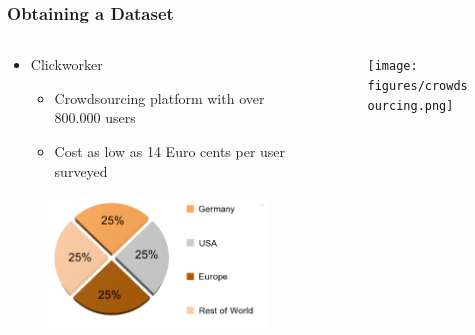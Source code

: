 \begin{frame}
	\frametitle{Obtaining a Dataset}
	\begin{columns}
		\begin{column}{0.5\textwidth}
			\begin{itemize}
				\item Clickworker
				\begin{itemize}
					\item Crowdsourcing platform with over 800.000 users
					\item Cost as low as 14 Euro cents per user surveyed
				\end{itemize}
			\end{itemize}
			\begin{figure}
				\centering
				\includegraphics[scale=0.3]{figures/clickworker_users.png}
			\end{figure}
		\end{column}
		\begin{column}{0.5\textwidth}
			\begin{figure}
				\centering
				\texttt{[image: figures/crowdsourcing.png]}
			\end{figure}
		\end{column}
	\end{columns}
\end{frame}

